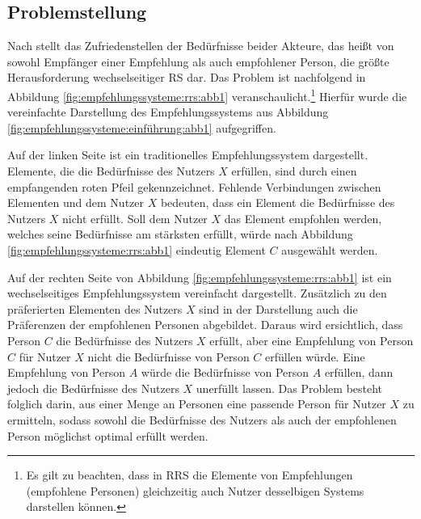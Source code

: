 \subsection{Problemstellung}
Nach \textcite[S. 35]{li:inproceedings} stellt das Zufriedenstellen der Bedürfnisse beider Akteure, das heißt von sowohl Empfänger einer Empfehlung als auch empfohlener Person, die größte Herausforderung wechselseitiger \ac{RS} dar.
Das Problem ist nachfolgend in Abbildung \ref{fig:empfehlungssysteme:rrs:abb1} veranschaulicht.\footnote{Es gilt zu beachten, dass in \ac{RRS} die Elemente von Empfehlungen (empfohlene Personen) gleichzeitig auch Nutzer desselbigen Systems darstellen können.}
Hierfür wurde die vereinfachte Darstellung des Empfehlungssystems aus Abbildung \ref{fig:empfehlungssysteme:einführung:abb1} aufgegriffen.

Auf der linken Seite ist ein traditionelles Empfehlungssystem dargestellt.
Elemente, die die Bedürfnisse des Nutzers $X$ erfüllen, sind durch einen empfangenden roten Pfeil gekennzeichnet.
Fehlende Verbindungen zwischen Elementen und dem Nutzer $X$ bedeuten, dass ein Element die Bedürfnisse des Nutzers $X$ nicht erfüllt.
Soll dem Nutzer $X$ das Element empfohlen werden, welches seine Bedürfnisse am stärksten erfüllt, würde nach Abbildung \ref{fig:empfehlungssysteme:rrs:abb1} eindeutig Element $C$ ausgewählt werden.

Auf der rechten Seite von Abbildung \ref{fig:empfehlungssysteme:rrs:abb1} ist ein wechselseitiges Empfehlungssystem vereinfacht dargestellt.
Zusätzlich zu den präferierten Elementen des Nutzers $X$ sind in der Darstellung auch die Präferenzen der empfohlenen Personen abgebildet.
Daraus wird ersichtlich, dass Person $C$ die Bedürfnisse des Nutzers $X$ erfüllt, aber eine Empfehlung von Person $C$ für Nutzer $X$ nicht die Bedürfnisse von Person $C$ erfüllen würde.
Eine Empfehlung von Person $A$ würde die Bedürfnisse von Person $A$ erfüllen, dann jedoch die Bedürfnisse des Nutzers $X$ unerfüllt lassen.
Das Problem besteht folglich darin, aus einer Menge an Personen eine passende Person für Nutzer $X$ zu ermitteln, sodass sowohl die Bedürfnisse des Nutzers als auch der empfohlenen Person möglichst optimal erfüllt werden.


